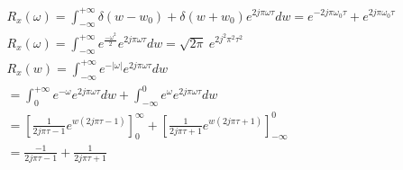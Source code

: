 \documentclass{article}[12pt]
\begin{document}
\begin{equation}
	\begin{gathered}
			R_{x}( \omega ) =\int _{-\infty }^{+\infty } \delta ( w-w_{0}) +\delta ( w+w_{0}) e^{2j\pi \omega \tau } dw=e^{-2j\pi \omega _{0} \tau } +e^{2j\pi \omega _{0} \tau }\\
			R_{x}( \omega ) =\int _{-\infty }^{+\infty } e^{\frac{-\omega ^{2}}{2}} e^{2j\pi \omega \tau } dw=\sqrt{2\pi } \ e^{2j^{2} \pi ^{2} \tau ^{2}}\\
			R_{x}( w) =\int _{-\infty }^{+\infty } e^{-|\omega |} e^{2j\pi \omega \tau } dw\\
			=\int _{0}^{+\infty } e^{-\omega } e^{2j\pi \omega \tau } dw+\int _{-\infty }^{0} e^{\omega } e^{2j\pi \omega \tau } dw\\
			=\left[\frac{1}{2j\pi \tau -1} e^{w( 2j\pi \tau -1)}\right]_{0}^{\infty } +\left[\frac{1}{2j\pi \tau +1} e^{w( 2j\pi \tau +1)}\right]_{-\infty }^{0}\\
			=\frac{-1}{2j\pi \tau -1} +\frac{1}{2j\pi \tau +1}
	\end{gathered}
\end{equation}


 
\end{document}
